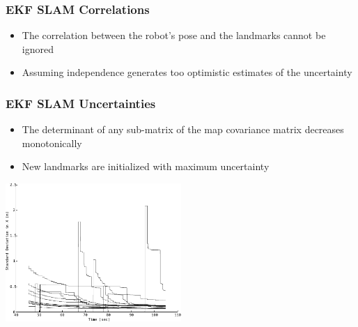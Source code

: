 \begin{frame}
    \frametitle{EKF SLAM Correlations}

    \begin{itemize}
        \item The correlation between the robot's pose and the landmarks cannot be ignored 
        \item Assuming independence generates too optimistic estimates of the uncertainty
    \end{itemize}

\end{frame}

\begin{frame}
    \frametitle{EKF SLAM Uncertainties}

    \begin{itemize}
    \item The determinant of any sub-matrix of the map covariance matrix decreases monotonically
    \item New landmarks are initialized with maximum uncertainty
    \end{itemize}

    \begin{center}
        \includegraphics[width=0.5\textwidth]{../images/ekf_slam/landmarks_uncertainty_decrease.pdf} %
    \end{center}
\end{frame}

